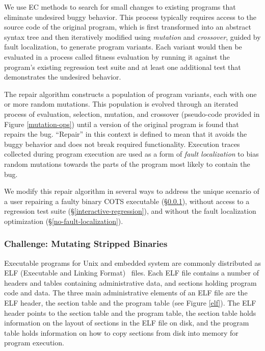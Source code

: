 \documentclass{sig-alternate}
\begin{document}
We use EC methods
\cite{forrest2009genetic,genprog-tse-journal,le2012representations,legoues2011systematicstudy}
to search for small changes to existing programs that eliminate
undesired buggy behavior.  This process typically requires access to
the source code of the original program, which is first transformed
into an abstract syntax tree and then iteratively modified using
\emph{mutation} and \emph{crossover}, guided by fault localization,
to generate program variants.  Each variant would then be evaluated in
a process called fitness evaluation by running it against the
program's existing regression test suite and at least one additional
test that demonstrates the undesired behavior.

The repair algorithm constructs a population of program variants, each
with one or more random mutations.  This population is evolved through
an iterated process of evaluation, selection, mutation, and crossover
(pseudo-code provided in Figure \ref{mutation-ops}) until a version of
the original program is found that repairs the bug.  ``Repair'' in
this context is defined to mean that it avoids the buggy behavior and
does not break required functionality.  Execution traces collected
during program execution are used as a form of \emph{fault
  localization} to bias random mutations towards the parts of the
program most likely to contain the bug.

We modify this repair algorithm in several ways to address the unique
scenario of a user repairing a faulty binary COTS executable
(\S\ref{mutate-mips}), without access to a regression test suite
(\S\ref{interactive-regression}), and without the fault localization
optimization (\S\ref{no-fault-localization}).

\subsubsection{Challenge: Mutating Stripped Binaries}
\label{mutate-mips}

Executable programs for Unix and embedded system are commonly distributed
as ELF (Executable and Linking Format)~\cite{tis1995tool} files.
Each ELF file contains a number of headers
and tables containing administrative data, and sections holding
program code and data.  The three main administrative elements of an
ELF file are the ELF header, the section table and the program table
(see Figure \ref{elf}).  The ELF header points to the section table and the
program table, the section table holds information on the layout of
sections in the ELF file on disk, and the program table holds
information on how to copy sections from disk into memory for program
execution.
\end{document}

